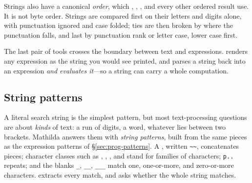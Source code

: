 Strings also have a canonical \emph{order}, which
, , , and every other ordered result use. It is not byte
order. Strings are compared first on their letters and digits alone, with punctuation
ignored and case folded; ties are then broken by where the punctuation falls, and
last by punctuation rank or letter case, lower case first.

\begin{codepairs}
\end{codepairs}

The last pair of tools crosses the boundary between text and expressions.
 renders any expression as the string you would see printed, and
 parses a string back into an expression \emph{and evaluates
it}---so a string can carry a whole
computation.

\begin{codepairs}
\end{codepairs}


\subsection{String patterns}
\label{ssec:ds-string-patterns}

A literal search string is the simplest pattern, but most text-processing questions
are about \emph{kinds} of text: a run of digits, a word, whatever lies between two
brackets. Mathilda answers them with \emph{string patterns},
built from the same pieces as the expression patterns of
\S\ref{sec:prog-patterns}. A , written \texttt{\textasciitilde\textasciitilde},
concatenates pieces; character classes such as ,
, , and  stand for
families of characters; \texttt{p..} repeats; and the blanks \texttt{\_},
\texttt{\_\_}, \texttt{\_\_\_} match one, one-or-more, and zero-or-more characters.
 extracts every match, and  asks whether the whole
string matches.

